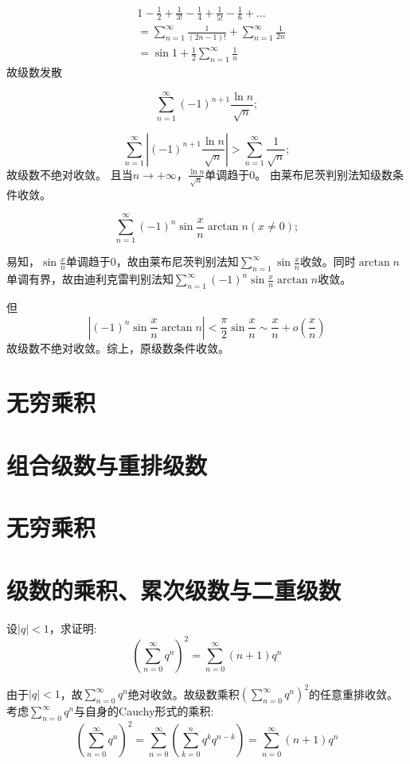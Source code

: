 \begin{align*}
    & 1 - \frac{1}{2} + \frac{1}{3!} - \frac{1}{4} + \frac{1}{5!} -
    \frac{1}{6} + \dots
    \\
    & = \sum_{n=1}^{\infty} \frac{1}{(2n-1)!} + \sum_{n=1}^{\infty}
    \frac{1}{2n}
    \\ &= \sin 1 + \frac{1}{2} \sum_{n=1}^{\infty} \frac{1}{n}
\end{align*}
故级数发散

\[
    \sum_{n=1}^{\infty} (-1)^{n+1} \frac{\ln n}{\sqrt{n}};
\]

\[
    \sum_{n=1}^{\infty} \left| (-1)^{n+1} \frac{\ln
    n}{\sqrt{n}} \right|
    > \sum_{n=1}^{\infty} \frac{1}{\sqrt{n}} ;
\]
故级数不绝对收敛。
且当\(n \to + \infty\)，\(\frac{\ln n}{\sqrt{n}}\)单调趋于0。
由莱布尼茨判别法知级数条件收敛。

\[
    \sum_{n=1}^{\infty} (-1)^n \sin \frac{x}{n} \arctan n (x \neq 0);
\]

易知，\(\sin \frac{x}{n}\)单调趋于0，故由莱布尼茨判别法知\(\sum_{n=1}^{\infty} \sin
\frac{x}{n}\)收敛。同时\(\arctan n\)单调有界，故由迪利克雷判别法知\(\sum_{n=1}^{\infty}
(-1)^{n} \sin \frac{x}{n} \arctan n\)收敛。

但\[
    \left| (-1)^{n}\sin \frac{x}{n} \arctan n \right| < \frac{\pi}{2}
    \sin \frac{x}{n} \sim \frac{x}{n} + o(\frac{x}{n})
\]
故级数不绝对收敛。综上，原级数条件收敛。

\section{无穷乘积}
\section{组合级数与重排级数}
\section{无穷乘积}
\section{级数的乘积、累次级数与二重级数}
\begin{problem}
    设\(\left\vert q \right\vert < 1\)，求证明:
    \[
        \left( \sum_{n=0}^{\infty} q^{n} \right)^2
        =\sum_{n=0}^{\infty} (n + 1) q^{n}
    \]
\end{problem}
\begin{solution}
    由于\(\left\vert q \right\vert < 1\)，故\(\sum_{n=0}^{\infty}
    q^{n}\)绝对收敛。故级数乘积\(\left( \sum_{n=0}^{\infty} q^{n}
    \right)^2\)的任意重排收敛。
    考虑\(\sum_{n=0}^{\infty} q^{n}\)与自身的Cauchy形式的乘积:
    \[
        \left( \sum_{n=0}^{\infty} q^{n} \right)^2
        =\sum_{n=0}^{\infty} \left( \sum_{k=0}^{n} q^{k}
        q^{n-k} \right)
        =\sum_{n=0}^{\infty} (n + 1) q^{n}
    \]
\end{solution}

